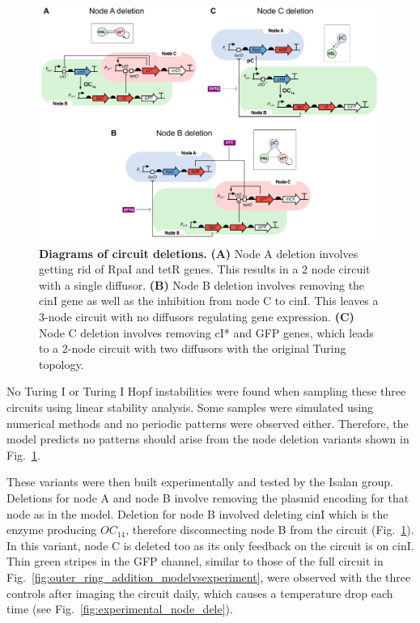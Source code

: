 \begin{figure}[H] %
    \centering
    \begin{adjustbox}{center}
        \includegraphics[width=1.1\textwidth]{chapters/Chapter 3/deletion_circuits} %
    \end{adjustbox}
    \caption{\textbf{Diagrams of circuit deletions.} \textbf{(A)} Node A deletion involves getting rid of RpaI and tetR genes. This results in a 2 node circuit with a single diffusor. \textbf{(B)} Node B deletion involves removing the cinI gene as well as the inhibition from node C to cinI. This leaves a 3-node circuit with no diffusors regulating gene expression. \textbf{(C)} Node C deletion involves removing cI* and GFP genes, which leads to a 2-node circuit with two diffusors with the original Turing topology.}
    \label{fig:deletion_circuits}
\end{figure}

No Turing I or Turing I Hopf instabilities were found when sampling these three circuits using linear stability analysis.
Some samples were simulated using numerical methods and no periodic patterns were observed either.
Therefore, the model predicts no patterns should arise from the node deletion variants shown in Fig.~\ref{fig:deletion_circuits}.

These variants were then built experimentally and tested by the
Isalan group.
Deletions for node A and node B involve removing the plasmid encoding for that node as in the model.
Deletion for node B involved deleting cinI which is the enzyme producing $OC_{14}$, therefore disconnecting node B from the circuit (Fig.~\ref{fig:deletion_circuits}).
In this variant, node C is deleted too as its only feedback on the circuit is on cinI.
Thin green stripes in the GFP channel, similar to those of the full circuit in Fig.~\ref{fig:outer_ring_addition_modelvsexperiment}, were observed with the three controls after imaging the circuit daily, which causes a temperature drop each time (see Fig.~\ref{fig:experimental_node_dele}).


